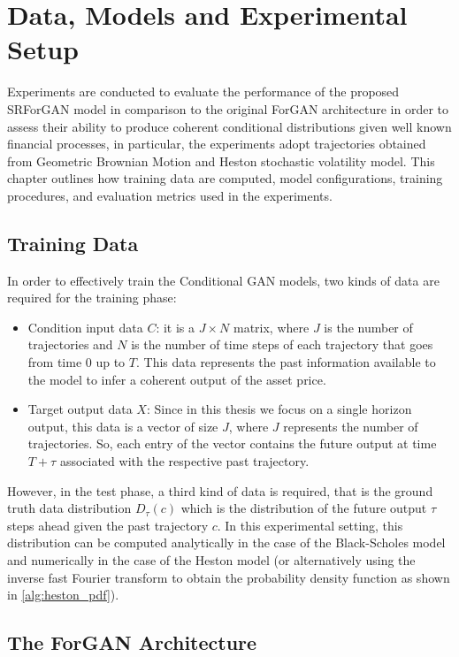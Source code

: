 \chapter{Data, Models and Experimental Setup}
Experiments are conducted to evaluate the performance of the proposed SRForGAN model in comparison to the original ForGAN architecture in order to assess their ability to produce coherent conditional distributions given well known financial processes, 
in particular, the experiments adopt trajectories obtained from Geometric Brownian Motion and Heston stochastic volatility model. 
This chapter outlines how training data are computed, model configurations, training procedures, and evaluation metrics used in the experiments.

\section{Training Data}
In order to effectively train the Conditional GAN models, two kinds of data are required for the training phase:
\begin{itemize}
    \item Condition input data $C$: it is a $J \times N$ matrix, where $J$ is the number of trajectories and $N$ is the number of time steps of each trajectory that goes from time 0 up to $T$.
     This data represents the past information available to the model to infer a coherent output of the asset price.
     \item Target output data $X$: Since in this thesis we focus on a single horizon output, this data is a vector of size $J$, where $J$ represents the number of trajectories.
    So, each entry of the vector contains the future output at time $T + \tau$ associated with the respective past trajectory. 
    \end{itemize}

However, in the test phase, a third kind of data is required, that is the ground truth data distribution $D_\tau(c)$ which is the 
distribution of the future output $\tau$ steps ahead given the past trajectory $c$. In this experimental setting, this distribution can be 
computed analytically in the case of the Black-Scholes model and 
numerically in the case of the Heston model (or alternatively using the inverse fast Fourier transform to obtain the probability density function as shown in \ref{alg:heston_pdf}).\\

\section{The ForGAN Architecture}
\label{sec:forgan}

